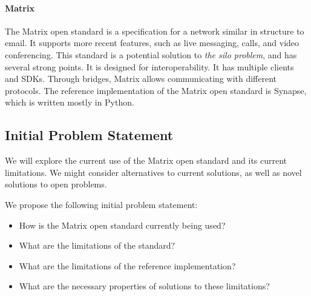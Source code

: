 \paragraph{Matrix}
The Matrix open standard\cite{matrix_org_spec} is a specification for a network similar in structure to email.
It supports more recent features, such as live messaging, calls, and video conferencing.
This standard is a potential solution to \textit{the silo problem}, and has several strong points.
It is designed for interoperability.
It has multiple clients\cite{matrix_org_clients} and SDKs\cite{matrix_org_sdks}.
Through bridges, Matrix allows communicating with different protocols\cite{matrix_org_bridges}.
The reference implementation of the Matrix open standard is Synapse\cite{matrix_org_synapse}, which is written mostly in Python.

\subsection{Initial Problem Statement}\label{subsec:initial_problem_statement}
We will explore the current use of the Matrix open standard and its current limitations.
We might consider alternatives to current solutions, as well as novel solutions to open problems.

We propose the following initial problem statement:
\begin{itemize}
    \item How is the Matrix open standard currently being used?
    \item What are the limitations of the standard?
    \item What are the limitations of the reference implementation?
    \item What are the necessary properties of solutions to these limitations?
\end{itemize}